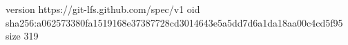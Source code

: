 version https://git-lfs.github.com/spec/v1
oid sha256:a062573380fa1519168e37387728cd3014643e5a5dd7d6a1da18aa00c4cd5f95
size 319
